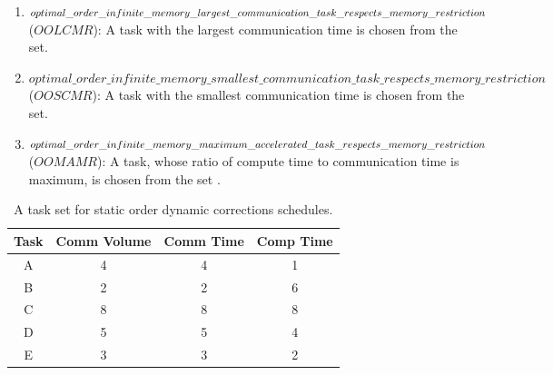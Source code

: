 \documentclass[sigconf]{acmart}
\begin{document}
	\begin{enumerate}[label=\roman*)]
		\item $optimal \_ \allowbreak order \_ \allowbreak infinite \_ \allowbreak memory \_ \allowbreak largest \_ \allowbreak communication \_ \linebreak[4]\allowbreak task \_ \allowbreak respects \_ \allowbreak memory \_ \allowbreak restriction$ ($OOLCMR$): A task with the largest communication time is chosen from the set.
		\item $optimal \_ \allowbreak order \_ \allowbreak infinite \_ \allowbreak memory \_ \allowbreak smallest \_ \allowbreak communication \_ \allowbreak task \_ \allowbreak respects \_ \allowbreak memory \_ \allowbreak restriction$ ($OOSCMR$): A task with the smallest communication time is chosen from the set.
		\item $optimal \_ \allowbreak order \_ \allowbreak infinite \_ \allowbreak memory \_ \allowbreak maximum \_ \allowbreak accelerated \_ \linebreak[4]\allowbreak task \_ \allowbreak respects \_ \allowbreak memory \_ \allowbreak restriction$ ($OOMAMR$): A task, whose ratio of compute time to communication time is maximum, is chosen from the set .
	\end{enumerate}
	
	\begin{table}[htb]
		\begin{center}
			
			\begin{tabular}{|c|c|c|c|}
				\hline
				Task & Comm Volume & Comm Time & Comp Time\\ \hline 
				A & 4 & 4 &  1\\ \hline
				B & 2 & 2 & 6\\ \hline
				C & 8 & 8 & 8\\ \hline
				D & 5 & 5 & 4\\ \hline
				E & 3 & 3 & 2\\ \hline
			\end{tabular}
			\caption{\label{tab:staticOrderDynamicCorrectionsExample} A task set for static order dynamic corrections schedules.}
		\end{center}
	\end{table}
	
\end{document}

